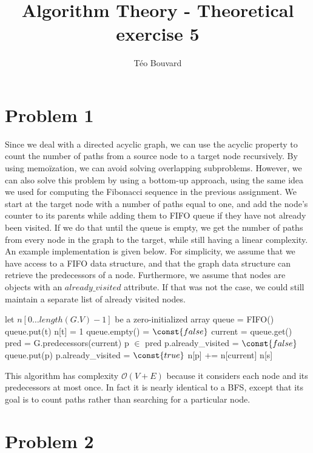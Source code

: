 \documentclass[a4paper, 10pt, twoside]{article}
\begin{document}
\title{Algorithm Theory - Theoretical exercise 5}
\author{T\'eo Bouvard}
\maketitle

\section*{Problem 1}

Since we deal with a directed acyclic graph, we can use the acyclic property to count the number of paths from a source node to a target node recursively. By using memoïzation, we can avoid solving overlapping subproblems. However, we can also solve this problem by using a bottom-up approach, using the same idea we used for computing the Fibonacci sequence in the previous assignment.
We start at the target node with a number of paths equal to one, and add the node's counter to its parents while adding them to FIFO queue if they have not already been visited. If we do that until the queue is empty, we get the number of paths from every node in the graph to the target, while still having a linear complexity. An example implementation is given below. For simplicity, we assume that we have access to a FIFO data structure, and that the graph data structure can retrieve the predecessors of a node. Furthermore, we assume that nodes are objects with an $already\_visited$ attribute. If that was not the case, we could still maintain a separate list of already visited nodes.

\begin{codebox}
	\zi let $n[0 \ldots length(G.V) - 1]$ be a zero-initialized array
	\zi queue = FIFO()
	\zi queue.put(t)
	\zi n[t] = 1
	\zi \While queue.empty() = $\const{false}$ \Do
	\zi current = queue.get()
	\zi pred = G.predecessors(current)
	\zi \For p $\in$ pred \Do
	\zi \If p.already\_visited = $\const{false}$ \Do
	\zi queue.put(p)
	\zi p.already\_visited = $\const{true}$ \End
	\zi n[p] += n[current] \End \End
	\zi \Return n[s] \End
\end{codebox}

This algorithm has complexity $\mathcal{O}(V+E)$ because it considers each node and its predecessors at most once. In fact it is nearly identical to a BFS, except that its goal is to count paths rather than searching for a particular node.

\section*{Problem 2}
\end{document}

